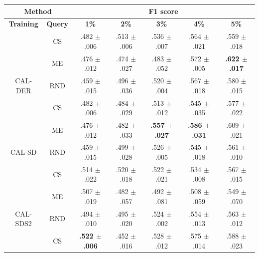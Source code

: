 \begin{table}[htbp]
\centering

\begin{tabular*}{\linewidth}{c|c|@{\extracolsep{\fill}}ccccc}
\toprule
\multicolumn{2}{c|}{\textbf{Method}} & \multicolumn{5}{c}{\textbf{F1 score}} \\
\midrule
\textbf{Training} & \textbf{Query} & \textbf{1\%} & \textbf{2\%} & \textbf{3\%} & \textbf{4\%} & \textbf{5\%}\\
\midrule
 & CS & .482 $\pm$ {\small .006} & .513 $\pm$ {\small .006} & .536 $\pm$ {\small .007} & .564 $\pm$ {\small .021} & .559 $\pm$ {\small .018}\\

 & ME & .476 $\pm$ {\small .012} & .474 $\pm$ {\small .027} & .483 $\pm$ {\small .052} & .572 $\pm$ {\small .005} & \textbf{.622 $\pm$ {\small .017}}\\

\multirow{-3}{*}{\raggedright\arraybackslash CAL-DER} & RND & .459 $\pm$ {\small .015} & .496 $\pm$ {\small .036} & .520 $\pm$ {\small .004} & .567 $\pm$ {\small .018} & .580 $\pm$ {\small .015}\\
\midrule
 & CS & .482 $\pm$ {\small .006} & .484 $\pm$ {\small .029} & .513 $\pm$ {\small .012} & .545 $\pm$ {\small .035} & .577 $\pm$ {\small .022}\\

 & ME & .476 $\pm$ {\small .012} & .482 $\pm$ {\small .033} & \textbf{.557 $\pm$ {\small .027}} & \textbf{.586 $\pm$ {\small .031}} & .609 $\pm$ {\small .021}\\

\multirow{-3}{*}{\raggedright\arraybackslash CAL-SD} & RND & .459 $\pm$ {\small .015} & .499 $\pm$ {\small .028} & .526 $\pm$ {\small .005} & .545 $\pm$ {\small .018} & .561 $\pm$ {\small .010}\\
\midrule
 & CS & .514 $\pm$ {\small .022} & .520 $\pm$ {\small .018} & .522 $\pm$ {\small .021} & .534 $\pm$ {\small .008} & .567 $\pm$ {\small .015}\\

 & ME & .507 $\pm$ {\small .019} & .482 $\pm$ {\small .057} & .492 $\pm$ {\small .081} & .508 $\pm$ {\small .059} & .549 $\pm$ {\small .070}\\

\multirow{-3}{*}{\raggedright\arraybackslash CAL-SDS2} & RND & .494 $\pm$ {\small .010} & .495 $\pm$ {\small .020} & .524 $\pm$ {\small .002} & .554 $\pm$ {\small .013} & .563 $\pm$ {\small .012}\\
\midrule
 & CS & \textbf{.522 $\pm$ {\small .006}} & .452 $\pm$ {\small .016} & .528 $\pm$ {\small .012} & .575 $\pm$ {\small .014} & .588 $\pm$ {\small .023}\\


\end{tabular*}
\end{table}
